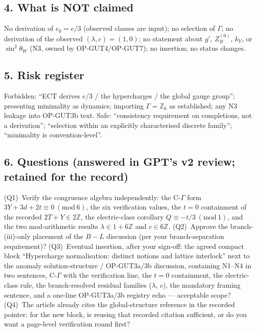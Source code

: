 \subsection*{4. What is NOT claimed}
No derivation of $e_0=e/3$ (observed classes are input); no
selection of $\Gamma$; no derivation of the observed
$(\lambda,c)=(1,0)$; no statement about $g'$, $Z_B^{(0)}$, $k_Y$,
or $\sin^2\theta_W$ (N3, owned by OP-GUT4/OP-GUT7); no insertion;
no status changes.

\subsection*{5. Risk register}
Forbidden: ``ECT derives $e/3$ / the hypercharges / the global
gauge group''; presenting minimality as dynamics; importing
$\Gamma=\mathbb Z_6$ as established; any N3 leakage into
OP-GUT3b text.
Safe: ``consistency requirement on completions, not a
derivation''; ``selection within an explicitly characterised
discrete family''; ``minimality is convention-level''.

\subsection*{6. Questions (answered in GPT's v2 review; retained
for the record)}
(Q1)~Verify the congruence algebra independently: the C-$\Gamma$
form $3Y+3d+2t\equiv0\ (\mathrm{mod}\ 6)$, the six verification
values, the $t=0$ containment of the recorded $2T+Y\in2\mathbb Z$,
the electric-class corollary $Q\equiv-t/3\ (\mathrm{mod}\ 1)$,
and the two mod-arithmetic results $\lambda\in1+6\mathbb Z$ and
$c\in6\mathbb Z$.
(Q2)~Approve the branch-(iii)-only placement of the $B{-}L$
discussion (per your branch-separation requirement)?
(Q3)~Eventual insertion, after your sign-off: the agreed compact
block ``Hypercharge normalisation: distinct notions and lattice
interlock'' next to the anomaly solution-structure /
OP-GUT3a/3b discussion, containing N1--N4 in two sentences,
C-$\Gamma$ with the verification line, the $t=0$ containment,
the electric-class rule, the branch-resolved residual families
($\lambda$, $c$), the mandatory framing sentence, and a one-line
OP-GUT3a/3b registry echo --- acceptable scope?
(Q4)~The article already cites the global-structure reference in
the recorded pointer; for the new block, is reusing that recorded
citation sufficient, or do you want a page-level verification
round first?
